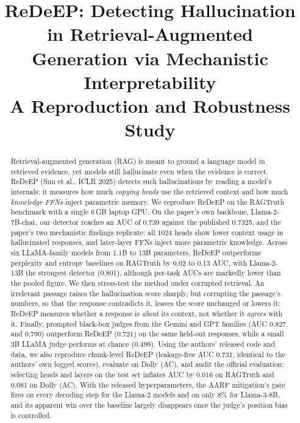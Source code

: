 \documentclass[conference]{IEEEtran}
\begin{document}
\title{ReDeEP: Detecting Hallucination in Retrieval-Augmented Generation via Mechanistic Interpretability\\[4pt]
\large A Reproduction and Robustness Study}

\author{
\and
{}
}

\maketitle

\begin{abstract}
Retrieval-augmented generation (RAG) is meant to ground a language model in retrieved evidence, yet models still hallucinate even when the evidence is correct. ReDeEP (Sun et al., ICLR 2025) detects such hallucinations by reading a model's internals: it measures how much \emph{copying heads} use the retrieved context and how much \emph{knowledge FFNs} inject parametric memory. We reproduce ReDeEP on the RAGTruth benchmark with a single 6\,GB laptop GPU. On the paper's own backbone, Llama-2-7B-chat, our detector reaches an AUC of 0.739 against the published 0.7325, and the paper's two mechanistic findings replicate: all 1024 heads show lower context usage in hallucinated responses, and later-layer FFNs inject more parametric knowledge. Across six LLaMA-family models from 1.1B to 13B parameters, ReDeEP outperforms perplexity and entropy baselines on RAGTruth by 0.02 to 0.13 AUC, with Llama-2-13B the strongest detector (0.801), although per-task AUCs are markedly lower than the pooled figure. We then stress-test the method under corrupted retrieval. An irrelevant passage raises the hallucination score sharply, but corrupting the passage's numbers, so that the response contradicts it, leaves the score unchanged or lowers it: ReDeEP measures whether a response is \emph{about} its context, not whether it \emph{agrees} with it. Finally, prompted black-box judges from the Gemini and GPT families (AUC 0.827 and 0.790) outperform ReDeEP (0.721) on the same held-out responses, while a small 3B LLaMA judge performs at chance (0.499). Using the authors' released code and data, we also reproduce chunk-level ReDeEP (leakage-free AUC 0.731, identical to the authors' own logged scores), evaluate on Dolly (AC), and audit the official evaluation: selecting heads and layers on the test set inflates AUC by 0.016 on RAGTruth and 0.081 on Dolly (AC). With the released hyperparameters, the AARF mitigation's gate fires on every decoding step for the Llama-2 models and on only 8\% for Llama-3-8B, and its apparent win over the baseline largely disappears once the judge's position bias is controlled.
\end{abstract}
\end{document}
